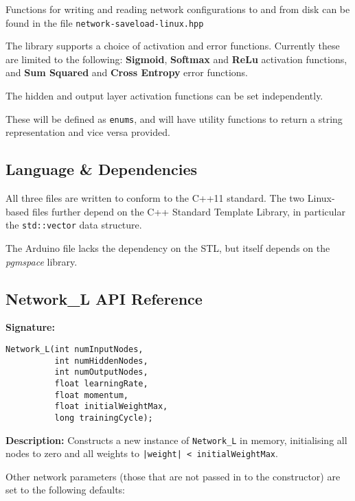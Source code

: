 \documentclass[a4paper]{article}
\begin{document}
Functions for writing and reading network configurations to and from disk can be found in the file \lstinline{network-saveload-linux.hpp}

The library supports a choice of activation and error functions. Currently these are limited to the following: \textbf{Sigmoid}, \textbf{Softmax} and \textbf{ReLu} activation functions, and \textbf{Sum Squared} and \textbf{Cross Entropy} error functions.

The hidden and output layer activation functions can be set independently.

These will be defined as \lstinline{enums}, and will have utility functions to return a string representation and vice versa provided.

\subsection{Language \& Dependencies}%
\label{subsec:dn_language}

All three files are written to conform to the C++11 standard\cite{nnref0}. The two Linux-based files further depend on the C++ Standard Template Library, in particular the \lstinline{std::vector} data structure.

The Arduino file lacks the dependency on the STL, but itself depends on the \textit{pgmspace} library.\cite{nnref1}

\subsection{Network\_L API Reference}%
\label{subsec:dn_API_networkl}

\hrulefill %

\textbf{Signature:} \begin{lstlisting} 
Network_L(int numInputNodes,
          int numHiddenNodes,
          int numOutputNodes,
          float learningRate,
          float momentum,
          float initialWeightMax,
          long trainingCycle);
\end{lstlisting}

\textbf{Description: }
Constructs a new instance of \lstinline{Network_L} in memory, initialising all nodes to zero and all weights to \lstinline{|weight| < initialWeightMax}.

Other network parameters (those that are not passed in to the constructor) are set to the following defaults:
\end{document}
